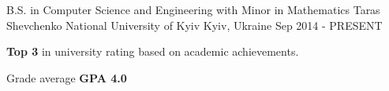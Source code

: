 

\begin{cventries}

  \cventry
    {B.S. in Computer Science and Engineering with Minor in Mathematics} %
    {Taras Shevchenko National University of Kyiv} %
    {Kyiv, Ukraine} %
    {Sep 2014 - PRESENT} %
    {
      \begin{cvitems} %
        \item {\textbf{Top 3} in university rating based on academic achievements.}
        \item {Grade average \textbf{GPA 4.0}}
      \end{cvitems}
    }
\end{cventries}
